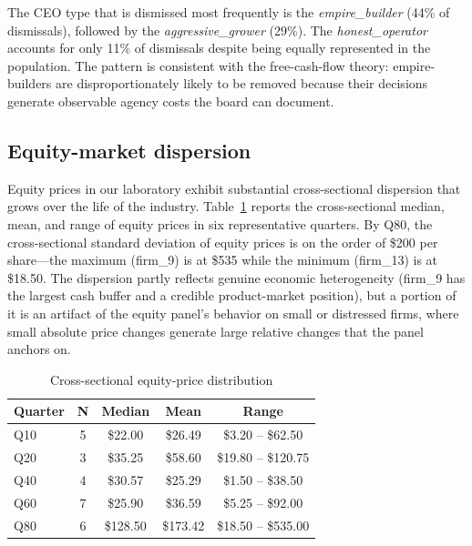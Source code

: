 \documentclass[11pt]{article}
\begin{document}
The CEO type that is dismissed most frequently is the
\textit{empire\_builder} (44\% of dismissals), followed by the
\textit{aggressive\_grower} (29\%). The \textit{honest\_operator}
accounts for only 11\% of dismissals despite being equally represented
in the population. The pattern is consistent with the
\citet{jensen1986agency} free-cash-flow theory: empire-builders are
disproportionately likely to be removed because their decisions
generate observable agency costs the board can document.

\subsection{Equity-market dispersion}

Equity prices in our laboratory exhibit substantial cross-sectional
dispersion that grows over the life of the industry. Table~\ref{tab:prices}
reports the cross-sectional median, mean, and range of equity prices in
six representative quarters. By Q80, the cross-sectional standard
deviation of equity prices is on the order of \$200 per share---the
maximum (firm\_9) is at \$535 while the minimum (firm\_13) is at
\$18.50. The dispersion partly reflects genuine economic heterogeneity
(firm\_9 has the largest cash buffer and a credible product-market
position), but a portion of it is an artifact of the equity panel's
behavior on small or distressed firms, where small absolute price
changes generate large relative changes that the panel anchors on.

\begin{table}[t]\centering\small
\caption{Cross-sectional equity-price distribution}\label{tab:prices}
\begin{tabular}{lcccc}
\toprule
Quarter & N & Median & Mean & Range \\
\midrule
Q10 & 5 & \$22.00 & \$26.49 & \$3.20 -- \$62.50 \\
Q20 & 3 & \$35.25 & \$58.60 & \$19.80 -- \$120.75 \\
Q40 & 4 & \$30.57 & \$25.29 & \$1.50 -- \$38.50 \\
Q60 & 7 & \$25.90 & \$36.59 & \$5.25 -- \$92.00 \\
Q80 & 6 & \$128.50 & \$173.42 & \$18.50 -- \$535.00 \\
\bottomrule
\end{tabular}
\end{table}
\end{document}
